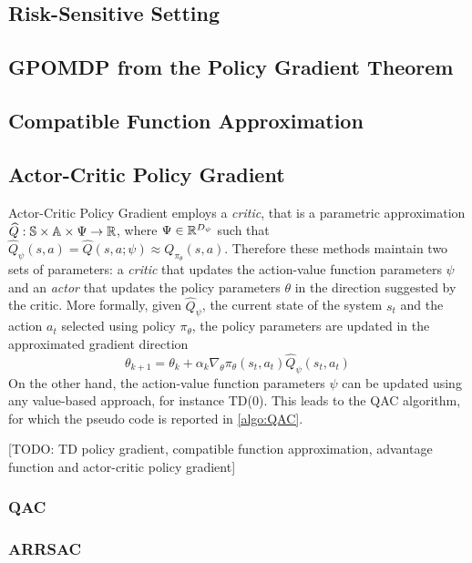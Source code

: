 \subsection{Risk-Sensitive Setting}

\subsection{GPOMDP from the Policy Gradient Theorem}

\subsection{Compatible Function Approximation}

\subsection{Actor-Critic Policy Gradient}
Actor-Critic Policy Gradient employs a \emph{critic}, that is a parametric
approximation $\widehat{Q}: \mathbb{S} \times \mathbb{A} \times \Psi \to \mathbb{R}$, where $\Psi \in
\mathbb{R}^{D_\psi}$ such that $\widehat{Q}_\psi(s, a) = \widehat{Q}(s, a; \psi)
\approx Q_{\pi_\theta}(s,a)$. Therefore these methods maintain two sets of
parameters: a \emph{critic} that updates the action-value function parameters
$\psi$ and an \emph{actor} that updates the policy parameters $\theta$ in the
direction suggested by the critic. More formally, given $\widehat{Q}_\psi$, the
current state of the system $s_t$ and the action $a_t$ selected using policy
$\pi_\theta$, the policy parameters are updated in the approximated gradient 
direction
\begin{equation}
	\theta_{k+1} = \theta_k + \alpha_k \nabla_\theta \pi_\theta(s_t, a_t) 
	\widehat{Q}_\psi(s_t, a_t) 
\end{equation}
On the other hand, the action-value function parameters $\psi$ can be updated
using any value-based approach, for instance TD(0). This leads to the QAC
algorithm, for which the pseudo code is reported in \ref{algo:QAC}.

[TODO: TD policy gradient,
compatible function approximation, advantage function and actor-critic policy
gradient]

\subsubsection{QAC}

\subsubsection{ARRSAC}

